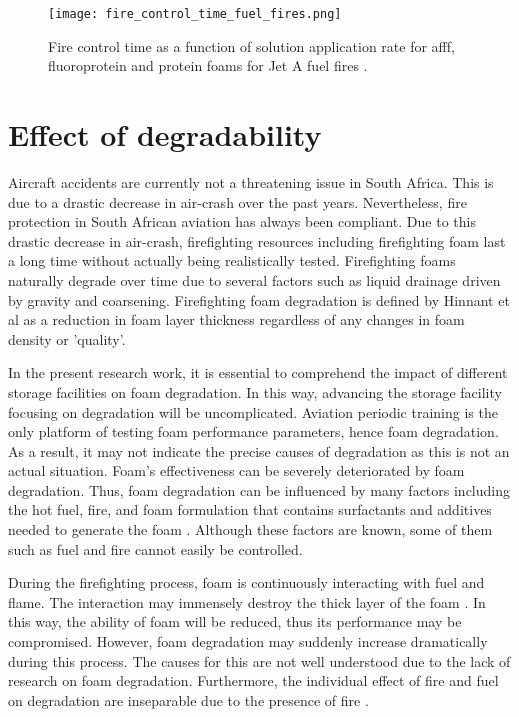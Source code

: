 \begin{figure}[H]
    \centering
    \texttt{[image: fire\_control\_time\_fuel\_fires.png]}
    \caption{Fire control time as a function of solution application rate for \acrshort{afff}, fluoroprotein and protein foams for Jet A fuel fires \cite{geyer1972evaluation}.}
    \label{ch2:figure:fuel}
\end{figure}

\section{Effect of degradability}
Aircraft accidents are currently not a threatening issue in South Africa. This is due to a drastic decrease in air-crash over the past years. Nevertheless, fire protection in South African aviation has always been compliant. Due to this drastic decrease in air-crash, firefighting resources including firefighting foam last a long time without actually being realistically tested. Firefighting foams naturally degrade over time due to several factors such as liquid drainage driven by gravity and coarsening. Firefighting foam degradation is defined by Hinnant et al \cite{hinnant2017influence} as a reduction in foam layer thickness regardless of any changes in foam density or 'quality'.

In the present research work, it is essential to comprehend the impact of different storage facilities on foam degradation. In this way, advancing the storage facility focusing on degradation will be uncomplicated. Aviation periodic training is the only platform of testing foam performance parameters, hence foam degradation. As a result, it may not indicate the precise causes of degradation as this is not an actual situation. Foam's effectiveness can be severely deteriorated by foam degradation. Thus, foam degradation can be influenced by many factors including the hot fuel, fire, and foam formulation that contains surfactants and additives needed to generate the foam \cite{hinnant2017influence}. Although these factors are known, some of them such as fuel and fire cannot easily be controlled.    

During the firefighting process, foam is continuously interacting with fuel and flame. The interaction may immensely destroy the thick layer of the foam \cite{osei2015foam}. In this way, the ability of foam will be reduced, thus its performance may be compromised. However, foam degradation may suddenly increase dramatically during this process.  The causes for this are not well understood due to the lack of research on foam degradation. Furthermore, the individual effect of fire and fuel on degradation are inseparable due to the presence of fire \cite{hinnant2017influence}. 

